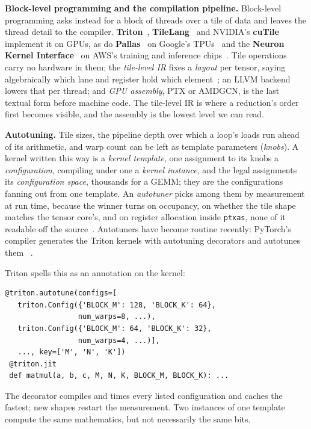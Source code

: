 \documentclass[sigplan,nonacm]{acmart}
\begin{document}
\textbf{Block-level programming and the compilation pipeline.}
Block-level programming asks instead for a block of threads over a tile of data
and leaves the thread detail to the compiler. \textbf{Triton}~\cite{triton2019},
\textbf{TileLang}~\cite{tilelang2026} and NVIDIA's \textbf{cuTile}~\cite{cutile}
implement it on GPUs, as do \textbf{Pallas}~\cite{pallas} on Google's
TPUs~\cite{tpu2017} and the \textbf{Neuron Kernel Interface}~\cite{nki} on AWS's
training and inference chips~\cite{trainium}. Tile operations carry no hardware
in them; the \emph{tile-level IR} fixes a \emph{layout} per tensor, saying
algebraically which lane and register hold which
element~\cite{linearlayouts2026}; an LLVM backend lowers that per thread; and
\emph{GPU assembly}, PTX or AMDGCN, is the last textual form before machine code.
The tile-level IR is where a reduction's order first becomes visible, and the
assembly is the lowest level we can read.

\textbf{Autotuning.}
Tile sizes, the pipeline depth over which a loop's loads run ahead of its
arithmetic, and warp count can be left as template parameters (\emph{knobs}). A
kernel written this way is a \emph{kernel template}, one assignment to its knobs
a \emph{configuration}, compiling under one a \emph{kernel instance}, and the
legal assignments its \emph{configuration space}, thousands for a GEMM; they are
the configurations fanning out from one template. An \emph{autotuner} picks among them by measurement
at run time, because the winner turns on occupancy, on whether the tile shape
matches the tensor core's, and on register allocation inside \texttt{ptxas}, none
of it readable off the
source~\cite{tvm2018,ansor2020}. Autotuners have become routine recently:
PyTorch's compiler generates the Triton kernels with autotuning decorators and autotunes them
~\cite{triton2019,pytorch2_2024}.

Triton spells this as an annotation on the kernel:

\begin{lstlisting}[style=python]
 @triton.autotune(configs=[
   triton.Config({'BLOCK_M': 128, 'BLOCK_K': 64},
                 num_warps=8, ...),
   triton.Config({'BLOCK_M': 64, 'BLOCK_K': 32},
                 num_warps=4, ...)],
   ..., key=['M', 'N', 'K'])
 @triton.jit
 def matmul(a, b, c, M, N, K, BLOCK_M, BLOCK_K): ...
\end{lstlisting}

The decorator compiles and times every listed configuration and caches the fastest; 
new shapes restart
the measurement. Two instances of one template compute the same mathematics, but not necessarily
the same bits.
\end{document}
